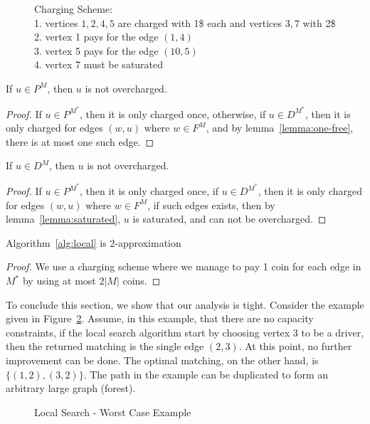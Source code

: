 \begin{figure}
\centering

\caption[]{
\label{fig:charging}
Charging Scheme:															\\
1. vertices $1,2,4,5$ are charged with 1\$ each and vertices $3,7$ with 2\$	\\
2. vertex 1 pays for the edge $(1, 4)$										\\
3. vertex 5 pays for the edge $(10, 5)$										\\
4. vertex 7 must be saturated
}
\end{figure}

\begin{lemma}
\label{lemma:p-not-charged}
If $u \in P^M$, then $u$ is not overcharged.
\end{lemma}

\begin{proof}
If $u \in P^{M^*}$, then it is only charged once, otherwise, 
if $u \in D^{M^*}$, then it is only charged for edges $(w, u)$ where $w \in F^M$,
and by lemma~\ref{lemma:one-free}, there is at most one such edge. 
\end{proof}

\begin{lemma}
\label{lemma:d-not-charged}
If $u \in D^M$, then $u$ is not overcharged.
\end{lemma}

\begin{proof}
If $u \in P^{M^*}$, then it is only charged once, 
if $u \in D^{M^*}$, then it is only charged for edges $(w, u)$ where $w \in F^M$,
if such edges exists, then by lemma~\ref{lemma:saturated}, $u$ is saturated, 
and can not be overcharged.
\end{proof}

\begin{theorem}
Algorithm~\ref{alg:local} is 2-approximation
\end{theorem}

\begin{proof}
We use a charging scheme where we manage to pay 1 coin for each edge in $M^*$
by using at most $2|M|$ coins.
\end{proof}


To conclude this section, we show that our analysis is tight.
Consider the example given in Figure~\ref{fig:localtight}.
Assume, in this example, that there are no capacity constraints,
if the local search algorithm start by choosing vertex $3$ to be a driver, 
then the returned matching is the single edge $(2,3)$.
At this point, no further improvement can be done.
The optimal matching, on the other hand, is $\{(1, 2), (3, 2)\}$. 
The path in the example can be duplicated to form an arbitrary large graph (forest).

\begin{figure} 

\caption{
\label{fig:localtight}
Local Search - Worst Case Example
}
\end{figure}